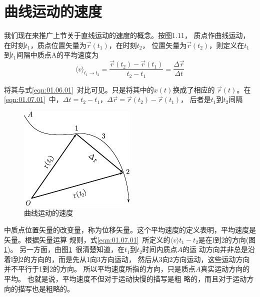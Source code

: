 \section{曲线运动的速度}\label{sec:01.07}

我们现在来推广上节关于直线运动的速度的概念。按图1.11，
质点作曲线运动，在时刻$t_1$，质点位置矢量为$\vec{r}\left(t_1\right)$，在时刻$t_2$，
位置矢量为$\vec{r}\left(t_2\right)$，则定义在$t_1$到$t_1$间隔中质点A的平均速度为
\begin{equation}\label{eqn:01.07.01}
    \langle v \rangle_{t_1\rightarrow t_2}=\frac{\vec{r}\left(t_2\right)-\vec{r}\left(t_1\right)}{t_2-t_1}=\frac{\Delta \vec{r}}{\Delta t}
\end{equation}

\noindent 将其与式\eqref{eqn:01.06.01}~对比可见。只是将其中的$x\left(t\right)$换成了相应的
$\vec{r}\left(t\right)$。在\eqref{eqn:01.07.01}~中，$\Delta t=t_2-t_1$，$\Delta \vec{r}=\vec{r}\left(t_2\right)-\vec{r}\left(t_1\right)$，
后者是$t_1$到$t_2$间隔
\begin{figure}
    \centering
    \small
    \includegraphics{figure/fig01.11}
    \caption{曲线运动的速度}
    \label{fig:01.11}
\end{figure}
中质点位置矢量的改变量，称为位移矢量。这个平均速度的定义表明，平均速度是矢量。根据矢量运算
规则，式\eqref{eqn:01.07.01}~所定义的$\langle v\rangle t_1-t_2$是在l到2的方向(图\ref{fig:01.11})。
另一方面，由图\ref{fig:01.11}~很清楚知道，在$t_1$到$t_2$时间内质点$A$的运
动方向并非总是沿着l到2的方向的，而是先从1向3方向运动，
然后从3向2方向运动，这些运动方向并不平行于1到2的方向。
所以平均速度所指的方向，只是质点$A$真实运动方向的平均。
也就是说，平均速度不但对于运动快慢的描写是粗
略的，而且对于运动方向的描写也是粗略的。

